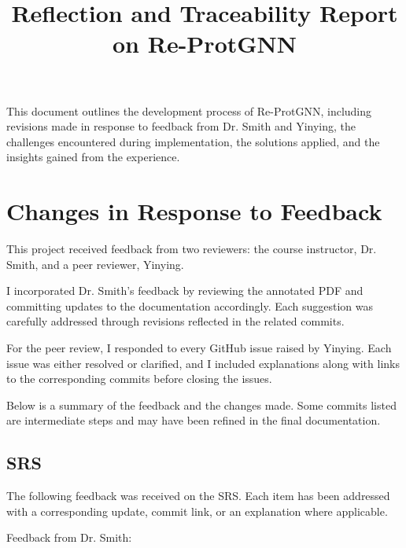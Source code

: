 \documentclass{article}
\title{Reflection and Traceability Report on Re-ProtGNN}
\author{\authname}
\date{}
\begin{document}
\maketitle

This document outlines the development process of Re-ProtGNN, including revisions made in response to feedback from Dr. Smith and Yinying, the challenges encountered during implementation, the solutions applied, and the insights gained from the experience.

\section{Changes in Response to Feedback}

This project received feedback from two reviewers: the course instructor, Dr. Smith, and a peer reviewer, Yinying.

I incorporated Dr. Smith’s feedback by reviewing the annotated PDF and committing updates to the documentation accordingly. Each suggestion was carefully addressed through revisions reflected in the related commits.

For the peer review, I responded to every GitHub issue raised by Yinying. Each issue was either resolved or clarified, and I included explanations along with links to the corresponding commits before closing the issues.

Below is a summary of the feedback and the changes made. Some commits listed are intermediate steps and may have been refined in the final documentation.

\subsection{SRS}
The following feedback was received on the SRS. Each item has been addressed with a corresponding update, commit link, or an explanation where applicable.

Feedback from Dr. Smith:
\end{document}
